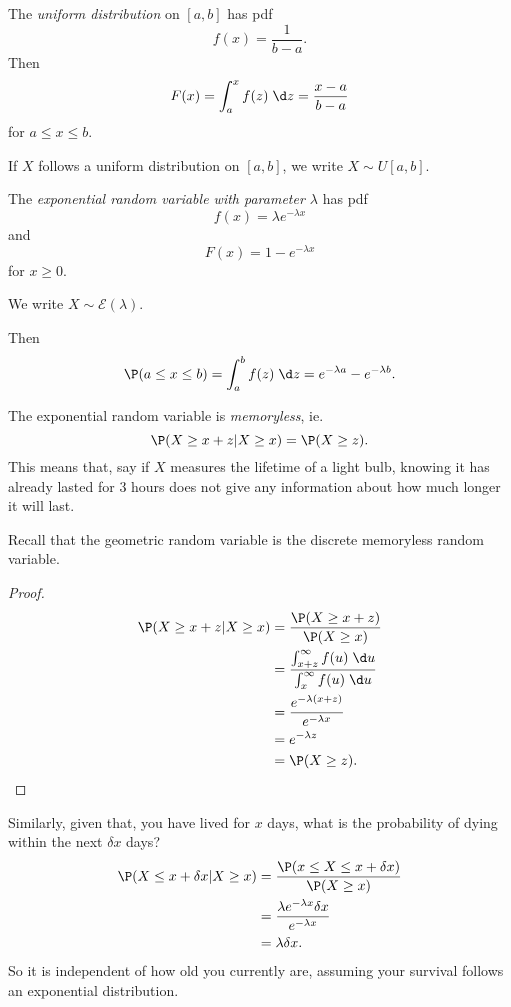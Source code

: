 \documentclass[a4paper]{article}
\begin{document}
\begin{defi}
  The \emph{uniform distribution} on $[a, b]$ has pdf
  \[
    f(x) = \frac{1}{b - a}.
  \]
  Then
  \[
    F(x) = \int_a^x f(z)\;\d z = \frac{x - a}{b - a}
  \]
  for $a \leq x \leq b$.

  If $X$ follows a uniform distribution on $[a, b]$, we write $X\sim U[a, b]$.
\end{defi}
\begin{defi}
  The \emph{exponential random variable with parameter $\lambda$} has pdf
  \[
    f(x) = \lambda e^{-\lambda x}
  \]
  and
  \[
    F(x) = 1 - e^{-\lambda x}
  \]
  for $x \geq 0$.

  We write $X \sim \mathcal{E}(\lambda)$.
\end{defi}

Then
\[
  \P(a \leq x \leq b) = \int_a^b f(z) \;\d z = e^{-\lambda a} - e^{-\lambda b}.
\]
\begin{prop}
  The exponential random variable is \emph{memoryless}, ie.
  \[
    \P(X \geq x + z | X \geq x) = \P(X \geq z).
  \]
  This means that, say if $X$ measures the lifetime of a light bulb, knowing it has already lasted for 3 hours does not give any information about how much longer it will last.
\end{prop}
Recall that the geometric random variable is the discrete memoryless random variable.

\begin{proof}
  \begin{align*}
    \P(X \geq x + z | X \geq x) &= \frac{\P(X \geq x + z)}{\P(X \geq x)}\\
    &= \frac{\int_{x + z}^\infty f(u)\;\d u}{\int_x^\infty f(u)\;\d u}\\
    &= \frac{e^{-\lambda(x + z)}}{e^{-\lambda x}}\\
    &= e^{-\lambda z}\\
    &= \P(X \geq z).
  \end{align*}
\end{proof}

Similarly, given that, you have lived for $x$ days, what is the probability of dying within the next $\delta x$ days?
\begin{align*}
  \P(X \leq x + \delta x | X \geq x) &= \frac{\P(x \leq X \leq x + \delta x)}{\P(X \geq x)}\\
  &= \frac{\lambda e^{-\lambda x} \delta x}{e^{-\lambda x}}\\
  &= \lambda \delta x.
\end{align*}
So it is independent of how old you currently are, assuming your survival follows an exponential distribution.
\end{document}
